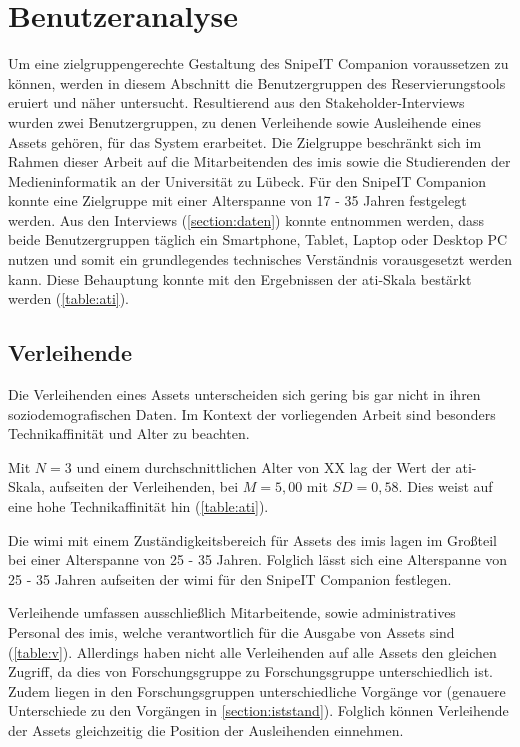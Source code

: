 \section{Benutzeranalyse}
\label{section:benutzer}
Um eine zielgruppengerechte Gestaltung des SnipeIT Companion voraussetzen zu
können, werden in diesem Abschnitt die Benutzergruppen des Reservierungstools
eruiert und näher untersucht. Resultierend aus den Stakeholder-Interviews wurden
zwei Benutzergruppen, zu denen Verleihende sowie Ausleihende eines Assets
gehören, für das System erarbeitet. Die Zielgruppe beschränkt sich im Rahmen
dieser Arbeit auf die Mitarbeitenden des \ac{imis} sowie die Studierenden der
Medieninformatik an der Universität zu Lübeck. Für den SnipeIT Companion konnte
eine Zielgruppe mit einer Alterspanne von 17 - 35 Jahren festgelegt werden. Aus
den Interviews (\ref{section:daten}) konnte entnommen werden, dass beide
Benutzergruppen täglich ein Smartphone, Tablet, Laptop oder Desktop PC nutzen
und somit ein grundlegendes technisches Verständnis vorausgesetzt werden kann.
Diese Behauptung konnte mit den Ergebnissen der \ac{ati}-Skala bestärkt werden
(\ref{table:ati}).


\subsection{Verleihende}
Die Verleihenden eines Assets unterscheiden sich gering bis gar nicht in ihren
soziodemografischen Daten. Im Kontext der vorliegenden Arbeit sind besonders
Technikaffinität und Alter zu beachten.

Mit $N=3$ und einem durchschnittlichen Alter von XX lag der Wert der
\ac{ati}-Skala, aufseiten der Verleihenden, bei $M=5,00$ mit $SD=0,58$. Dies
weist auf eine hohe Technikaffinität hin (\ref{table:ati}).

Die \ac{wimi} mit einem Zuständigkeitsbereich für Assets des \ac{imis} lagen im
Großteil bei einer Alterspanne von 25 - 35 Jahren. Folglich lässt sich eine
Alterspanne von 25 - 35 Jahren aufseiten der \ac{wimi} für den SnipeIT Companion
festlegen.

Verleihende umfassen ausschließlich Mitarbeitende, sowie administratives
Personal des \ac{imis}, welche verantwortlich für die Ausgabe von Assets sind
(\ref{table:v}). Allerdings haben nicht alle Verleihenden auf alle Assets den
gleichen Zugriff, da dies von Forschungsgruppe zu Forschungsgruppe
unterschiedlich ist. Zudem liegen in den Forschungsgruppen unterschiedliche
Vorgänge vor (genauere Unterschiede zu den Vorgängen in \ref{section:iststand}).
Folglich können Verleihende der Assets gleichzeitig die Position der
Ausleihenden einnehmen.

